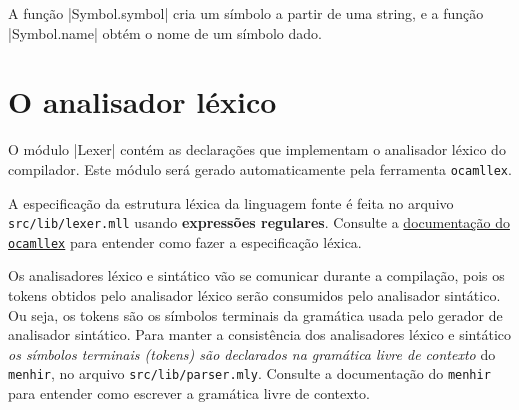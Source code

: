 \documentclass[a4paper,11pt,brazil]{article}
\begin{document}
A função \pyginline|Symbol.symbol| cria um símbolo a partir de uma
string, e a função \pyginline|Symbol.name| obtém o nome de um símbolo
dado.


\section{O  analisador léxico}

O módulo \pyginline|Lexer| contém as declarações que implementam o
analisador léxico do compilador. Este módulo será gerado
automaticamente pela ferramenta \texttt{ocamllex}.

A especificação da estrutura léxica da linguagem fonte é feita no
arquivo \texttt{src/lib/lexer.mll} usando \textbf{expressões
  regulares}. Consulte a
\href{https://ocaml.org/releases/4.12/htmlman/lexyacc.html}{documentação
  do \texttt{ocamllex}} para entender como fazer a especificação
léxica.

Os analisadores léxico e sintático vão se comunicar durante a
compilação, pois os tokens obtidos pelo analisador léxico serão
consumidos pelo analisador sintático. Ou seja, os tokens são os
símbolos terminais da gramática usada pelo gerador de analisador
sintático. Para manter a consistência dos analisadores léxico e
sintático \emph{os símbolos terminais (tokens) são declarados na
  gramática livre de contexto} do \texttt{menhir}, no arquivo
\texttt{src/lib/parser.mly}. Consulte a documentação do
\texttt{menhir} para entender como escrever a gramática livre de
contexto.
\end{document}
